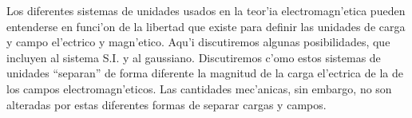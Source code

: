 Los diferentes sistemas de unidades usados en la teor'ia electromagn'etica pueden entenderse en funci'on de la libertad que existe para definir las unidades de carga y campo el'ectrico y magn'etico. Aqu'i discutiremos algunas posibilidades, que incluyen al sistema S.I. y al gaussiano. Discutiremos c'omo estos sistemas de unidades ``separan'' de forma diferente la magnitud de la carga el'ectrica de la de los campos electromagn'eticos. Las cantidades mec'anicas, sin embargo, no son alteradas por estas diferentes formas de separar cargas y campos.

